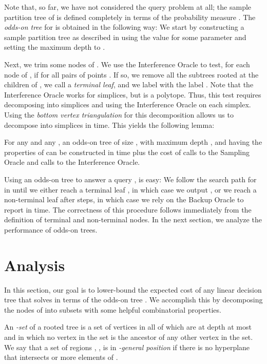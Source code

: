 \documentclass{patmorin}
\begin{document}
Note that, so far, we have not considered the query problem 
at all;  the sample partition tree  of 
is defined completely in terms of the probability measure .
The \emph{odds-on tree}  for 
is obtained in the following way:  We start by constructing a sample
partition tree  as described in 
using the value  for some parameter  and setting
the maximum depth to .

Next, we trim some nodes of . We use the
Interference Oracle to test, for each node  of , if
 for all pairs of points .  If so, we remove all the subtrees rooted at the children
of , we call  a \emph{terminal leaf}, and we label  with the
label .  Note that the Interference Oracle works
for simplices, but  is a polytope. Thus, this test requires
decomposing  into simplices and using the Interference
Oracle on each simplex. Using the \emph{bottom vertex triangulation}
\cite{c88} for this decomposition allows us to decompose  into
 simplices in  time.  This yields the following lemma:

\begin{lem}
  For any  and any , an odds-on tree of size ,
  with maximum depth , and having the
  properties of  can be constructed in
   time plus the cost of  calls
  to the Sampling Oracle and  calls to the
  Interference Oracle.
\end{lem}

Using an odds-on tree to answer a query , is easy: We follow
the search path for  in  until we either reach
a terminal leaf , in which case we output , or we reach a
non-terminal leaf  after  steps, in which case we rely
on the Backup Oracle to report  in  time.
The correctness of this procedure follows immediately from the definition
of terminal and non-terminal nodes.  In the next section, we analyze
the performance of odds-on trees.



\section{Analysis}

In this section, our goal is to lower-bound the expected cost of any
linear decision tree that solves  in terms of the odds-on
tree .  We accomplish this by decomposing the nodes
of  into subsets with some helpful combinatorial
properties.

An \emph{-set} of a rooted tree  is a set of vertices in  all of
which are at depth at most  and in which no vertex in the set is the
ancestor of any other vertex in the set.  We say that a set of regions
, , is in \emph{-general
position} if there is no hyperplane that intersects  or more elements
of .
\end{document}
